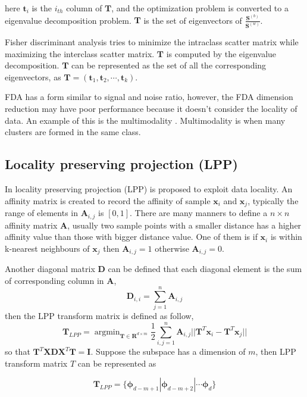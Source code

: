here $\bm{t}_i$ is the $i_{th}$ column of $\bm{T}$, and the optimization problem is converted to a eigenvalue decomposition problem. $\bm{T}$ is the set of eigenvectors of $\frac{\bm{S}^{(b)}}{\bm{S}^{(w)}}$.

Fisher discriminant analysis tries to minimize the intraclass scatter matrix while maximizing the interclass scatter matrix. $\bm{T}$ is computed by the eigenvalue decomposition. $\bm{T}$ can be represented as the set of all the corresponding eigenvectors, as $ \bm{T} = (\bm{t}_1,\bm{t}_2,\cdots,\bm{t}_k)$.

FDA has a form similar to signal and noise ratio, however, the FDA dimension reduction may have poor performance because it doesn't consider the locality of data. An example of this is the multimodality \cite{KLFDA}. Multimodality is when many clusters are formed in the same class. 

\subsection{Locality preserving projection (LPP)}

In \cite{LPP} locality preserving projection (LPP) is proposed to exploit data locality. An affinity matrix is created to record the affinity of sample $\bm{x}_i$ and $\bm{x}_j$,  typically the range of elements in $\bm{A}_{i,j}$ is $[0,1]$. There are many manners to define a $n \times n$ affinity matrix $\bm{A}$, usually two sample points with a smaller distance has a higher affinity value than those with bigger distance value. One of them is if  $\bm{x}_i$ is within k-nearest neighbours of $\bm{x}_j$ then $\bm{A}_{i,j} = 1$ otherwise  $\bm{A}_{i,j} = 0$.  

Another diagonal matrix $\bm{D}$ can be defined that each diagonal element is the sum of corresponding column in $\bm{A}$,
\begin{equation}
\bm{D}_{i,i} = \mathop{\sum}_{j=1}^n \bm{A}_{i, j} 
\end{equation}
then the LPP transform matrix is defined as follow,
\begin{equation}
\bm{T}_{LPP} = \mathop{\arg\min}_{\bm{T}\in\bm{R}^{d\times m}} \frac{1}{2}\mathop{\sum}_{i, j= 1}^n \bm{A}_{i,j} ||\bm{T}^T\bm{x}_i - \bm{T}^T\bm{x}_j||
\end{equation}
so that $ \bm{T}^T\bm{X}\bm{D}\bm{X}^T\bm{T} = \bm{I} $.
Suppose the subspace has a dimension of $m$, then LPP transform matrix $T$ can be represented as 

$$\bm{T}_{LPP} = \{ \bm{\phi}_{d-m+1} | \bm{\phi}_{d-m+2} | \cdots \bm{\phi}_{d}\} $$

